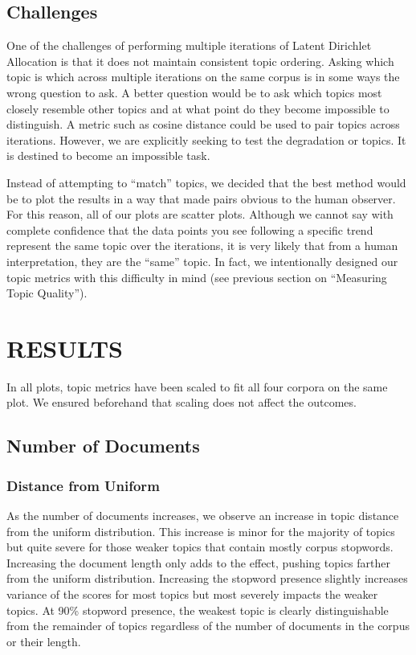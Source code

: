 \documentclass[letterpaper, 10 pt, conference]{ieeeconf}  %
\begin{document}
\subsection{Challenges}

One of the challenges of performing multiple iterations of Latent Dirichlet Allocation is that it does not maintain consistent topic ordering. Asking which topic is which across multiple iterations on the same corpus is in some ways the wrong question to ask. A better question would be to ask which topics most closely resemble other topics and at what point do they become impossible to distinguish. A metric such as cosine distance could be used to pair topics across iterations. However, we are explicitly seeking to test the degradation or topics. It is destined to become an impossible task.

Instead of attempting to ``match'' topics, we decided that the best method would be to plot the results in a way that made pairs obvious to the human observer. For this reason, all of our plots are scatter plots. Although we cannot say with complete confidence that the data points you see following a specific trend represent the same topic over the iterations, it is very likely that from a human interpretation, they are the ``same'' topic. In fact, we intentionally designed our topic metrics with this difficulty in mind (see previous section on ``Measuring Topic Quality'').

\section{RESULTS}

In all plots, topic metrics have been scaled to fit all four corpora on the same plot. We ensured beforehand that scaling does not affect the outcomes.

\subsection{Number of Documents}

\subsubsection{Distance from Uniform} As the number of documents increases, we observe an increase in topic distance from the uniform distribution. This increase is minor for the majority of topics but quite severe for those weaker topics that contain mostly corpus stopwords. Increasing the document length only adds to the effect, pushing topics farther from the uniform distribution. Increasing the stopword presence slightly increases variance of the scores for most topics but most severely impacts the weaker topics. At 90\% stopword presence, the weakest topic is clearly distinguishable from the remainder of topics regardless of the number of documents in the corpus or their length. 
\end{document}
